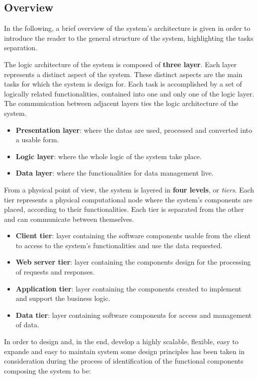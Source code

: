\subsection{Overview}

In the following, a brief overview of the system's architecture is given in order to introduce the reader to the general structure of the system, highlighting the tasks separation.

The logic architecture of the system is composed of \textbf{three layer}. Each layer represents a distinct aspect of the system. These distinct aspects are the main tasks for which the system is design for. Each task is accomplished by a set of logically related functionalities, contained into one and only one of the logic layer. The communication between adjacent layers ties the logic architecture of the system. 

\begin{itemize}
	\item \textbf{Presentation layer}: where the datas are used, processed and converted into a usable form.
	\item \textbf{Logic layer}: where the whole logic of the system take place.
	\item \textbf{Data layer}: where the functionalities for data management live.
\end{itemize}

From a physical point of view, the system is layered in \textbf{four levels}, or \textit{tiers}. Each tier represents a physical computational node where the system's components are placed, according to their functionalities. Each tier is separated from the other and can communicate between themselves.

\begin{itemize}
	\item \textbf{Client tier}: layer containing the software components usable from the client to access to the system's functionalities and use the data requested.
	\item \textbf{Web server tier}: layer containing the components design for the processing of requests and responses.
	\item \textbf{Application tier}: layer containing the components created to implement and support the business logic.
	\item \textbf{Data tier}: layer containing software components for access and management of data.
\end{itemize}

In order to design and, in the end, develop a highly scalable, flexible, easy to expande and easy to maintain system some design principles has been taken in consideration during the process of identification of the functional components composing the system to be:


